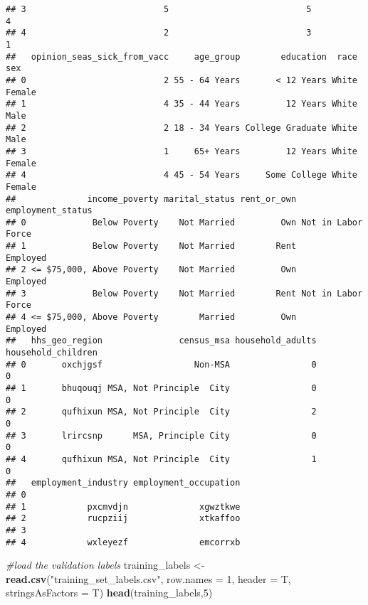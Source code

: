 \documentclass[
]{article}
\newenvironment{Shaded}{\begin{snugshade}}{\end{snugshade}}
\newcommand{\AttributeTok}[1]{\textcolor[rgb]{0.13,0.29,0.53}{#1}}
\newcommand{\CommentTok}[1]{\textcolor[rgb]{0.56,0.35,0.01}{\textit{#1}}}
\newcommand{\DecValTok}[1]{\textcolor[rgb]{0.00,0.00,0.81}{#1}}
\newcommand{\FunctionTok}[1]{\textcolor[rgb]{0.13,0.29,0.53}{\textbf{#1}}}
\newcommand{\NormalTok}[1]{#1}
\newcommand{\OtherTok}[1]{\textcolor[rgb]{0.56,0.35,0.01}{#1}}
\newcommand{\StringTok}[1]{\textcolor[rgb]{0.31,0.60,0.02}{#1}}
\begin{document}
\begin{verbatim}
## 3                           5                           5                 4
## 4                           2                           3                 1
##   opinion_seas_sick_from_vacc     age_group        education  race    sex
## 0                           2 55 - 64 Years       < 12 Years White Female
## 1                           4 35 - 44 Years         12 Years White   Male
## 2                           2 18 - 34 Years College Graduate White   Male
## 3                           1     65+ Years         12 Years White Female
## 4                           4 45 - 54 Years     Some College White Female
##              income_poverty marital_status rent_or_own  employment_status
## 0             Below Poverty    Not Married         Own Not in Labor Force
## 1             Below Poverty    Not Married        Rent           Employed
## 2 <= $75,000, Above Poverty    Not Married         Own           Employed
## 3             Below Poverty    Not Married        Rent Not in Labor Force
## 4 <= $75,000, Above Poverty        Married         Own           Employed
##   hhs_geo_region               census_msa household_adults household_children
## 0       oxchjgsf                  Non-MSA                0                  0
## 1       bhuqouqj MSA, Not Principle  City                0                  0
## 2       qufhixun MSA, Not Principle  City                2                  0
## 3       lrircsnp      MSA, Principle City                0                  0
## 4       qufhixun MSA, Not Principle  City                1                  0
##   employment_industry employment_occupation
## 0                                          
## 1            pxcmvdjn              xgwztkwe
## 2            rucpziij              xtkaffoo
## 3                                          
## 4            wxleyezf              emcorrxb
\end{verbatim}

\begin{Shaded}
\begin{Highlighting}[]
\CommentTok{\#load the validation labels}
\NormalTok{training\_labels }\OtherTok{\textless{}{-}} \FunctionTok{read.csv}\NormalTok{(}\StringTok{"training\_set\_labels.csv"}\NormalTok{, }\AttributeTok{row.names =} \DecValTok{1}\NormalTok{, }\AttributeTok{header =}\NormalTok{ T, }\AttributeTok{stringsAsFactors =}\NormalTok{ T)}
\FunctionTok{head}\NormalTok{(training\_labels,}\DecValTok{5}\NormalTok{)}
\end{Highlighting}
\end{Shaded}
\end{document}
